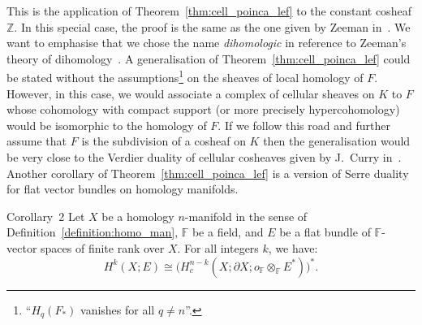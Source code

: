 \documentclass[AHL,Unicode,longabstracts,published]{cedram}
\newcommand{\Z}{\mathbb{Z}}
\newcommand{\F}{\mathbb{F}}
\begin{document}
This is the application of Theorem~\ref{thm:cell_poinca_lef} to the constant cosheaf $\Z$. In this special case, the proof is the same as the one given by Zeeman in~\cite[Theorem~1 p.~159]{Zee_dih_iii}.
We want to emphasise that we chose the name \emph{dihomologic} in reference to Zeeman's theory of dihomology~\cite{Zee_dih_i,Zee_dih_ii,Zee_dih_iii}. A generalisation of Theorem~\ref{thm:cell_poinca_lef} could be stated without the assumptions\footnote{``$H_q(F_*)$ vanishes for all $q\neq n$''.} on the sheaves of local homology of $F$. However, in this case, we would associate a complex of cellular sheaves on $K$ to $F$ whose cohomology with compact support (or more precisely hypercohomology) would be isomorphic to the homology of $F$. If we follow this road and further assume that $F$ is the subdivision of a cosheaf on $K$ then the generalisation would be very close to the Verdier duality of cellular cosheaves given by J.~Curry in~\cite{Cur_she_cos}. Another corollary of Theorem~\ref{thm:cell_poinca_lef} is a version of Serre duality for flat vector bundles on homology manifolds.

\begin{enonce*}{Corollary~2}
Let $X$ be a homology $n$-manifold in the sense of Definition~\ref{definition:homo_man}, $\F$ be a field, and $E$ be a flat bundle of $\F$-vector spaces of finite rank over $X$. For all integers $k$, we have:
\begin{equation*}
H^k(X;E)\cong \big(H^{n-k}_c\left(X;\partial X; o_\F\otimes_\F E^*\right)\big)^*.
\end{equation*}
\end{enonce*}
\end{document}

